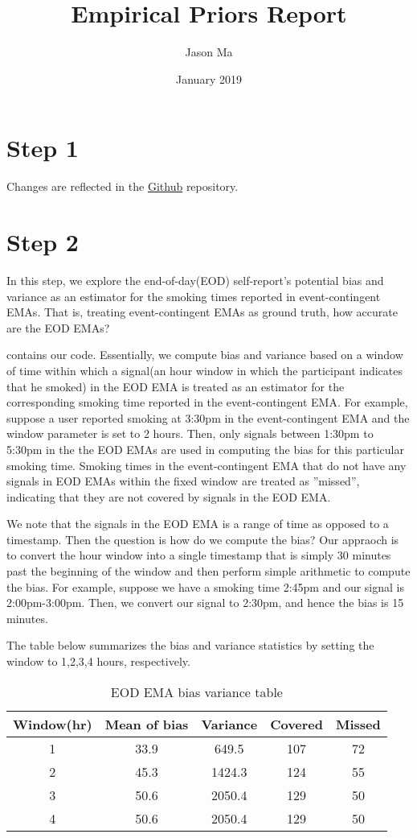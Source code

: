 \documentclass[11pt]{article}
\title{Empirical Priors Report}
\author{Jason Ma}
\date{January 2019}
\newcommand{\vsvs}{\vspace{0.5cm}}
\begin{document}
\maketitle
\section{Step 1}
Changes are reflected in the \href{https://github.com/wdempsey/sense2stop-lvm}{Github} repository.
\section{Step 2}
In this step, we explore the end-of-day(EOD) self-report's potential bias and variance as an estimator for the smoking times reported in event-contingent EMAs. That is, treating event-contingent EMAs as ground truth, how accurate are the EOD EMAs?

\vsvs
{} contains our code. Essentially, we compute bias and variance based on a window of time within which a signal(an hour window in which the participant indicates that he smoked) in the EOD EMA is treated as an estimator for the corresponding smoking time reported in the event-contingent EMA. For example, suppose a user reported smoking at 3:30pm in the event-contingent EMA and the window parameter is set to 2 hours. Then, only signals between 1:30pm to 5:30pm in the the EOD EMAs are used in computing the bias for this particular smoking time. Smoking times in the event-contingent EMA that do not have any signals in EOD EMAs within the fixed window are treated as ''missed'', indicating that they are not covered by signals in the EOD EMA.

\vsvs
We note that the signals in the EOD EMA is a range of time as opposed to a timestamp. Then the question is how do we compute the bias? Our appraoch is to convert the hour window into a single timestamp that is simply 30 minutes past the beginning of the window and then perform simple arithmetic to compute the bias. For example, suppose we have a smoking time 2:45pm and our signal is 2:00pm-3:00pm. Then, we convert our signal to 2:30pm, and hence the bias is 15 minutes. 

\vsvs
The table below summarizes the bias and variance statistics by setting the window to 1,2,3,4 hours, respectively. 
\begin{table}[h]
\centering
\begin{tabular}{|c|c|c|c|c|} 
 \hline
Window(hr)& Mean of bias & Variance & Covered & Missed\\
\hline
1 & 33.9 & 649.5 & 107 & 72 \\
\hline
2 & 45.3 & 1424.3 & 124 & 55 \\
\hline
3 & 50.6 & 2050.4 & 129 & 50 \\
\hline
4 & 50.6 & 2050.4 & 129 & 50 \\
\hline
\end{tabular}
\caption{EOD EMA bias variance table}
\label{table:1}
\end{table} 
\end{document}
